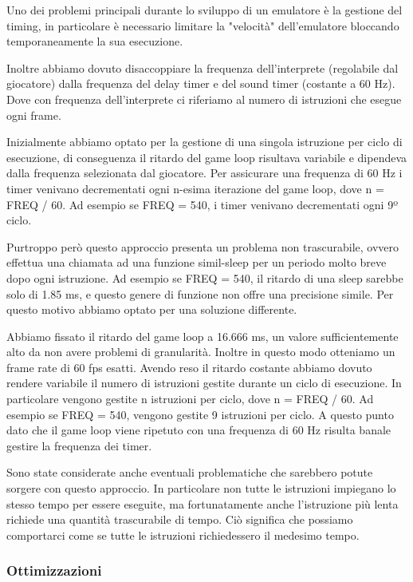 \documentclass[a4paper]{article}
\begin{document}
Uno dei problemi principali durante lo sviluppo di un emulatore è
la gestione del timing, in particolare è necessario limitare la
"velocità" dell'emulatore bloccando temporaneamente la sua
esecuzione.

Inoltre abbiamo dovuto disaccoppiare la frequenza dell'interprete
(regolabile dal giocatore) dalla frequenza del delay timer e del
sound timer (costante a 60 Hz). Dove con frequenza dell'interprete
ci riferiamo al numero di istruzioni che esegue ogni frame.


Inizialmente abbiamo optato per la gestione di una singola istruzione
per ciclo di esecuzione, di conseguenza il ritardo del game loop
risultava variabile e dipendeva dalla frequenza selezionata dal
giocatore. Per assicurare una frequenza di 60 Hz i timer
venivano decrementati ogni n-esima iterazione del game loop, dove
n = FREQ / 60. Ad esempio se FREQ = 540, i timer venivano
decrementati ogni 9º ciclo.

Purtroppo però questo approccio presenta un problema non
trascurabile, ovvero effettua una chiamata ad una funzione
simil-sleep per un periodo molto breve dopo ogni istruzione.
Ad esempio se FREQ = 540, il ritardo di una sleep sarebbe solo
di 1.85 ms, e questo genere di funzione non offre una precisione
simile. Per questo motivo abbiamo optato per una soluzione
differente.

Abbiamo fissato il ritardo del game loop a 16.666 ms, un valore
sufficientemente alto da non avere problemi di granularità. Inoltre
in questo modo otteniamo un frame rate di 60 fps esatti. Avendo
reso il ritardo costante abbiamo dovuto rendere variabile il numero
di istruzioni gestite durante un ciclo di esecuzione. In particolare
vengono gestite n istruzioni per ciclo, dove n = FREQ / 60.
Ad esempio se FREQ = 540, vengono gestite 9 istruzioni per ciclo.
A questo punto dato che il game loop viene ripetuto con una
frequenza di 60 Hz risulta banale gestire la frequenza dei timer.

Sono state considerate anche eventuali problematiche che sarebbero
potute sorgere con questo approccio. In particolare non tutte le
istruzioni impiegano lo stesso tempo per essere eseguite, ma
fortunatamente anche l'istruzione più lenta richiede una quantità
trascurabile di tempo. Ciò significa che possiamo
comportarci come se tutte le istruzioni richiedessero il medesimo
tempo.

\subsubsection{Ottimizzazioni}
\end{document}
